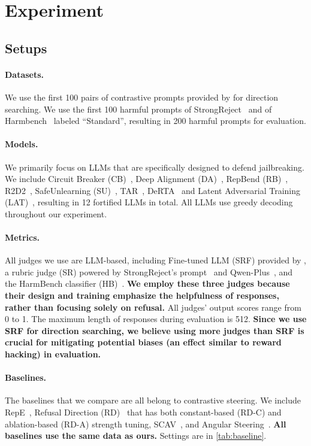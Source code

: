 \documentclass{article}
\theoremstyle{plain}
\theoremstyle{definition}
\theoremstyle{remark}
\begin{document}
\section{Experiment}\label{sec:experiment}

\subsection{Setups}

\paragraph{Datasets.} We use the first 100 pairs of contrastive prompts provided by \citet{singleDirection} for direction searching. We use the first 100 harmful prompts of StrongReject~\cite{strongReject} and of Harmbench~\cite{harmbench} labeled ``Standard'', resulting in 200 harmful prompts for evaluation.

\paragraph{Models.} We primarily focus on LLMs that are specifically designed to defend jailbreaking. We include Circuit Breaker (CB)~\cite{circuitBreaker}, Deep Alignment (DA)~\cite{shallow}, RepBend (RB)~\cite{repbend}, R2D2~\cite{harmbench}, SafeUnlearning (SU)~\cite{safeunlearning}, TAR~\cite{tar}, DeRTA~\cite{youliang} and Latent Adversarial Training (LAT)~\cite{lat}, resulting in 12 fortified LLMs in total. All LLMs use greedy decoding throughout our experiment.

\paragraph{Metrics.} All judges we use are LLM-based, including Fine-tuned LLM (SRF) provided by \citet{strongReject}, a rubric judge (SR) powered by StrongReject's prompt~\cite{strongReject} and Qwen-Plus~\cite{qwen3}, and the HarmBench classifier (HB)~\cite{harmbench}. \textbf{We employ these three judges because their design and training emphasize the helpfulness of responses, rather than focusing solely on refusal.} All judges' output scores range from 0 to 1. The maximum length of responses during evaluation is 512. \textbf{Since we use SRF for direction searching, we believe using more judges than SRF is crucial for mitigating potential biases (an effect similar to reward hacking) in evaluation.}

\paragraph{Baselines.} The baselines that we compare are all belong to contrastive steering. We include RepE~\cite{rep}, Refusal Direction (RD)~\cite{singleDirection} that has both constant-based (RD-C) and ablation-based (RD-A) strength tuning, SCAV~\cite{scav}, and Angular Steering~\cite{angle}. \textbf{All baselines use the same data as ours.} Settings are in \cref{tab:baseline}.
\end{document}

